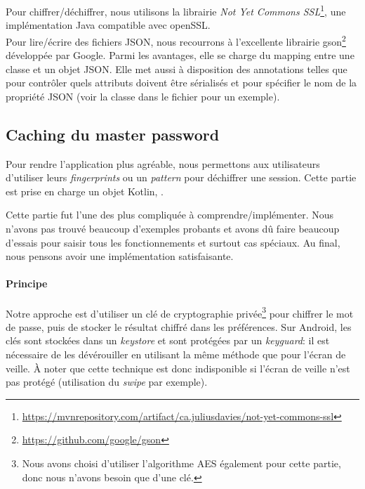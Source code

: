 Pour chiffrer/déchiffrer, nous utilisons la librairie \emph{Not Yet Commons SSL}\footnote{\url{https://mvnrepository.com/artifact/ca.juliusdavies/not-yet-commons-ssl}}, une implémentation Java compatible avec openSSL. \\
Pour lire/écrire des fichiers JSON, nous recourrons à l'excellente librairie gson\footnote{\url{https://github.com/google/gson}} développée par Google. Parmi les avantages, elle se charge du mapping entre une classe et un objet JSON. Elle met aussi à disposition des annotations telles que  pour contrôler quels attributs doivent être sérialisés et  pour spécifier le nom de la propriété JSON (voir la classe  dans le fichier  pour un exemple). 

\subsection{Caching du master password}

Pour rendre l'application plus agréable, nous permettons aux utilisateurs d'utiliser leurs \emph{fingerprints} ou un \emph{pattern} pour déchiffrer une session. Cette partie est prise en charge un  objet Kotlin, .

\begin{notepar}{}
    Cette partie fut l'une des plus compliquée à comprendre/implémenter. Nous n'avons pas trouvé beaucoup d'exemples probants et avons dû faire beaucoup d'essais pour saisir tous les fonctionnements et surtout cas spéciaux. Au final, nous pensons avoir une implémentation satisfaisante.
\end{notepar}

\paragraph*{Principe}
Notre approche est d'utiliser un clé de cryptographie privée\footnote{Nous avons choisi d'utiliser l'algorithme AES également pour cette partie, donc nous n'avons besoin que d'une clé.} pour chiffrer le mot de passe, puis de stocker le résultat chiffré dans les préférences. Sur Android, les clés sont stockées dans un \emph{keystore} et sont protégées par un \emph{keyguard}: il est nécessaire de les dévérouiller en utilisant la même méthode que pour l'écran de veille. À noter que cette technique est donc indisponible si l'écran de veille n'est pas protégé (utilisation du \emph{swipe} par exemple).

